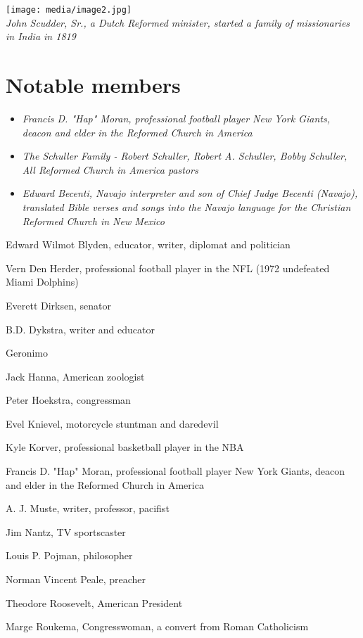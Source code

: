 \texttt{[image: media/image2.jpg]}\\
\emph{John Scudder, Sr., a Dutch Reformed minister, started a family of
missionaries in India in 1819}

\section{Notable members}\label{notable-members}

\begin{itemize}
\item
  \emph{Francis D. "Hap" Moran, professional football player New York
  Giants, deacon and elder in the Reformed Church in America}
\item
  \emph{The Schuller Family - Robert Schuller, Robert A. Schuller, Bobby
  Schuller, All Reformed Church in America pastors}
\item
  \emph{Edward Becenti, Navajo interpreter and son of Chief Judge
  Becenti (Navajo), translated Bible verses and songs into the Navajo
  language for the Christian Reformed Church in New Mexico}
\end{itemize}

Edward Wilmot Blyden, educator, writer, diplomat and politician

Vern Den Herder, professional football player in the NFL (1972
undefeated Miami Dolphins)

Everett Dirksen, senator

B.D. Dykstra, writer and educator

Geronimo

Jack Hanna, American zoologist

Peter Hoekstra, congressman

Evel Knievel, motorcycle stuntman and daredevil

Kyle Korver, professional basketball player in the NBA

Francis D. "Hap" Moran, professional football player New York Giants,
deacon and elder in the Reformed Church in America

A. J. Muste, writer, professor, pacifist

Jim Nantz, TV sportscaster

Louis P. Pojman, philosopher

Norman Vincent Peale, preacher

Theodore Roosevelt, American President

Marge Roukema, Congresswoman, a convert from Roman Catholicism

